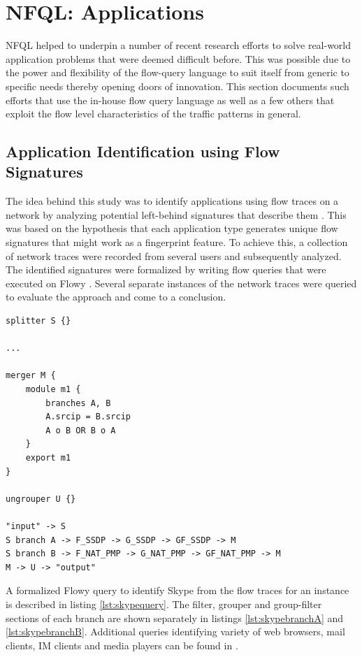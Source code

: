 \chapter{NFQL: Applications}\label{ch:flowy-applications}

\ac{NFQL} helped to underpin a number of recent research efforts to solve
real-world application problems that were deemed difficult before. This was
possible due to the power and flexibility of the flow-query language to suit
itself from generic to specific needs thereby opening doors of innovation.
This section documents such efforts that use the in-house flow query language
as well as a few others that exploit the flow level characteristics of the
traffic patterns in general.

\section{Application Identification using Flow
Signatures}\label{sec:application-signatures}
The idea behind this study was to identify applications using flow traces on a network by analyzing potential left-behind signatures that describe them \cite{vperelman:2011, vperelman:thesis:2010}. This was based on the hypothesis that each application type generates unique flow signatures that might work as a fingerprint feature. To achieve this, a collection of network traces were recorded from several users and subsequently analyzed. The identified signatures were formalized by writing flow queries that were executed on Flowy \cite{kkanev:2010}. Several separate instances of the network traces were queried to evaluate the approach and come to a conclusion.

\begin{lstlisting}
splitter S {}

...

merger M {
	module m1 {
		branches A, B
		A.srcip = B.srcip
		A o B OR B o A
	}
	export m1
}

ungrouper U {}

"input" -> S
S branch A -> F_SSDP -> G_SSDP -> GF_SSDP -> M
S branch B -> F_NAT_PMP -> G_NAT_PMP -> GF_NAT_PMP -> M
M -> U -> "output"
\end{lstlisting}
A formalized Flowy query to identify Skype from the flow traces for an instance is described in listing \ref{lst:skypequery}. The filter, grouper and group-filter sections of each branch are shown separately in listings \ref{lst:skypebranchA} and \ref{lst:skypebranchB}. Additional queries identifying variety of web browsers, mail clients, IM clients and media players can be found in \cite{vperelman:thesis:2010}.

